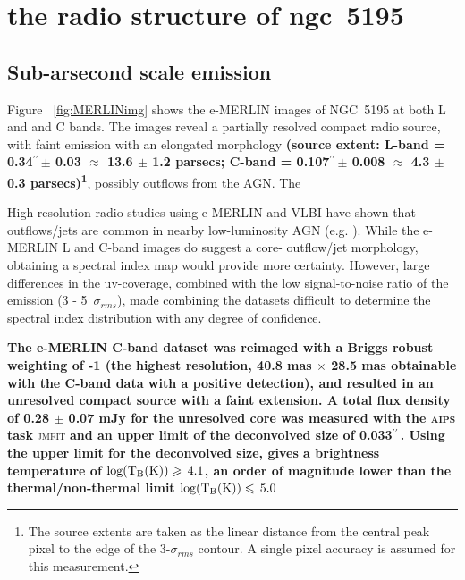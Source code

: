 \documentclass[fleqn,usenatbib]{mnras}
\def\Fig{Figure}
\def\arcs{$^{\prime\prime}\,$}
\begin{document}
\section{the radio structure of ngc~5195}

\subsection{Sub-arsecond scale emission}

\Fig~ \ref{fig:MERLINimg} shows the e-MERLIN images of NGC~5195 at both L and  and C bands. The 
images reveal a partially resolved compact radio source, with faint emission with an 
elongated morphology  \textbf{(source extent: L-band = 0.34\arcs $\pm$ 0.03 $\approx$ 13.6 $\pm$ 1.2 parsecs; C-band = 0.107\arcs $\pm$ 0.008 $\approx$ 4.3 $\pm$ 0.3 parsecs)\footnote{The source extents are taken as the linear distance from the central peak pixel to the edge of the 3-$\sigma_{rms}$ contour. A single pixel accuracy is assumed for this measurement.}},  possibly outflows from the AGN. The

High resolution radio studies using 
e-MERLIN and VLBI have shown that outflows/jets are common in nearby low-luminosity AGN (e.g. 
\citealt{Krips+2007,GP09}). While the e-MERLIN L and C-band images do suggest a core-
outflow/jet morphology, obtaining a spectral index map would provide more certainty. However, 
large differences in the uv-coverage, combined with the low signal-to-noise ratio of the 
emission (3 - 5~$\sigma_{rms}$), made combining the datasets difficult to determine the 
spectral index distribution with any degree of confidence. 

\textbf{The e-MERLIN C-band dataset was reimaged with a Briggs robust weighting of -1 (the highest 
resolution, 40.8 mas $\times$ 28.5 mas obtainable with the C-band data with a positive 
detection), and resulted in an unresolved compact source with a faint extension. A total flux 
density of 0.28 $\pm$ 0.07 mJy for the unresolved core was measured with the \textsc{aips}} \textbf{task} \textsc{jmfit} \textbf{and an upper limit of the deconvolved size of 0.033\arcs. Using the upper limit for the deconvolved size, gives a brightness temperature of ${\rm log(T_{B} (K))}\geq\,4.1$, an order of magnitude lower than the thermal/non-thermal limit  ${\rm log(T_{B} (K))}\leq\,5.0$ \citep{Condon1992}}
\end{document}

